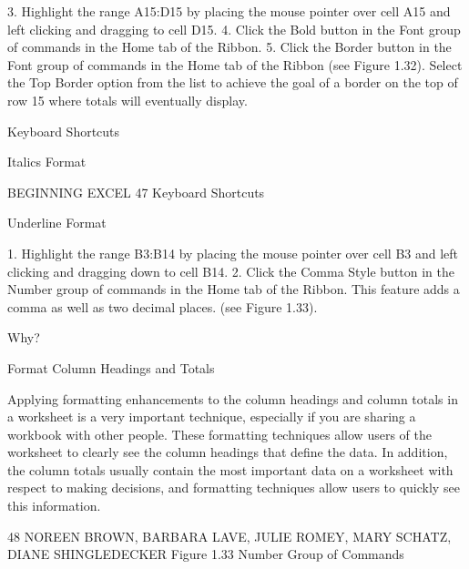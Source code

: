 3. Highlight the range A15:D15 by placing the mouse pointer over cell A15 and left clicking and
dragging to cell D15.
4. Click the Bold button in the Font group of commands in the Home tab of the Ribbon.
5. Click the Border button in the Font group of commands in the Home tab of the Ribbon
(see Figure 1.32). Select the Top Border option from the list to achieve the goal of a border on
the top of row 15 where totals will eventually display.


Keyboard Shortcuts


Italics Format





BEGINNING EXCEL 47
Keyboard Shortcuts


Underline Format





1. Highlight the range B3:B14 by placing the mouse pointer over cell B3 and left clicking and
dragging down to cell B14.
2. Click the Comma Style button in the Number group of commands in the Home tab of the
Ribbon. This feature adds a comma as well as two decimal places. (see Figure 1.33).




Why?

Format Column Headings and Totals

Applying formatting enhancements to the column headings and column totals in a worksheet is a very important
technique, especially if you are sharing a workbook with other people. These formatting techniques allow users of
the worksheet to clearly see the column headings that define the data. In addition, the column totals usually contain
the most important data on a worksheet with respect to making decisions, and formatting techniques allow users
to quickly see this information.




48 NOREEN BROWN, BARBARA LAVE, JULIE ROMEY, MARY SCHATZ, DIANE SHINGLEDECKER
Figure 1.33 Number Group of Commands


